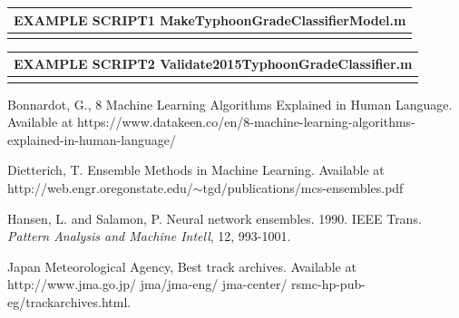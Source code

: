 \documentclass{SBCbookchapter}
\begin{document}
	

	
	
	\begin{table}[!htpb]
		\begin{tabular}{|l|}
			\multicolumn{1}{l}{{EXAMPLE SCRIPT1} {\tiny MakeTyphoonGradeClassifierModel.m} }\\\hline
			\parbox[b]{5.9in}{}\\\hline
		\end{tabular}
	\end{table}
	
		\begin{table}[!htpb]
		\begin{tabular}{|l|}
			\multicolumn{1}{l}{{EXAMPLE SCRIPT2} {\tiny Validate2015TyphoonGradeClassifier.m} }\\\hline
			\parbox[b]{5.9in}{}\\\hline
		\end{tabular}
	\end{table}
	

	
	\newpage
	\begin{thebibliography}{9}
		
		  {Bonnardot, G.}, 8 Machine Learning Algorithms Explained in Human Language. Available at https://www.datakeen.co/en/8-machine-learning-algorithms-explained-in-human-language/
		
		 {Dietterich, T.} Ensemble Methods in Machine Learning.  Available at http://web.engr.oregonstate.edu/$\sim$tgd/publications/mcs-ensembles.pdf
		
		 {Hansen, L. and Salamon, P.} Neural network ensembles. 1990. IEEE Trans. \emph{Pattern Analysis and Machine Intell}, 12, 993-1001.
		
		 {Japan Meteorological Agency},  Best track archives. Available at  http://www.jma.go.jp/ jma/jma-eng/ jma-center/ rsmc-hp-pub-eg/trackarchives.html.
		
	\end{thebibliography}
\end{document}
